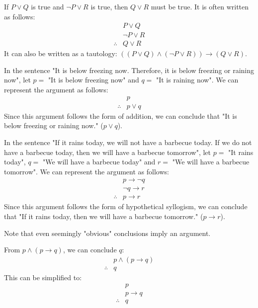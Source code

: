 \begin{definition}[Resolution]
    If $P \lor Q$ is true and $\neg P \lor R$ is true, then $Q \lor R$ must be true. It is often written as follows:
    \[
        \begin{array}{rl}
            & P \lor Q \\
            & \neg P \lor R \\
            \hline
            \therefore & Q \lor R
        \end{array}
    \]
    It can also be written as a tautology: $((P \lor Q) \land (\neg P \lor R)) \to (Q \lor R)$.
\end{definition}

\begin{eg}
    In the sentence "It is below freezing now. Therefore, it is below freezing or raining now", let $p =$ "It is below freezing now" and $q =$ "It is raining now". We can represent the argument as follows:
    \[
        \begin{array}{rl}
            & p \\
            \hline
            \therefore & p \lor q
        \end{array}
    \]
    Since this argument follows the form of addition, we can conclude that "It is below freezing or raining now." ($p \lor q$).
\end{eg}

\begin{eg}
    In the sentence "If it rains today, we will not have a barbecue today. If we do not have a barbecue today, then we will have a barbecue tomorrow", let $p =$ "It rains today", $q =$ "We will have a barbecue today" and $r =$ "We will have a barbecue tomorrow". We can represent the argument as follows:
    \[
        \begin{array}{rl}
            & p \to \neg q \\
            & \neg q \to r \\
            \hline
            \therefore & p \to r
        \end{array}
    \]
    Since this argument follows the form of hypothetical syllogism, we can conclude that "If it rains today, then we will have a barbecue tomorrow." ($p \to r$).
\end{eg}
Note that even seemingly "obvious" conclusions imply an argument.
\begin{eg}
    From $p \land (p \to q)$, we can conclude $q$:
    \[
        \begin{array}{rl}
            & p \land (p \to q) \\
            \hline
            \therefore & q
        \end{array}
    \]
    This can be simplified to:
    \[
        \begin{array}{rl}
            & p \\
            & p \to q \\
            \hline
            \therefore & q
        \end{array}
    \]
\end{eg}


